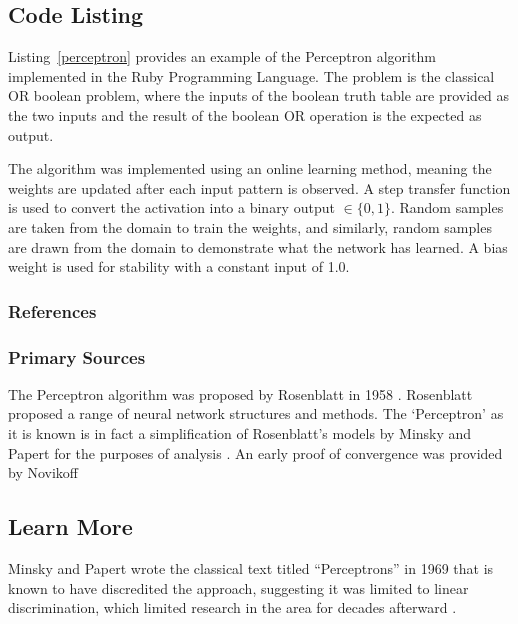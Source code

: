 \subsection{Code Listing}
Listing~\ref{perceptron} provides an example of the Perceptron algorithm implemented in the Ruby Programming Language. 
The problem is the classical OR boolean problem, where the inputs of the boolean truth table are provided as the two inputs and the result of the boolean OR operation is the expected as output.

The algorithm was implemented using an online learning method, meaning the weights are updated after each input pattern is observed. A step transfer function is used to convert the activation into a binary output $\in\{0,1\}$. Random samples are taken from the domain to train the weights, and similarly, random samples are drawn from the domain to demonstrate what the network has learned. A bias weight is used for stability with a constant input of 1.0.



\subsubsection{References}

% 
% 
\subsubsection{Primary Sources}
The Perceptron algorithm was proposed by Rosenblatt in 1958 \cite{Rosenblatt1958}. Rosenblatt proposed a range of neural network structures and methods. The `Perceptron' as it is known is in fact a simplification of Rosenblatt's models by Minsky and Papert for the purposes of analysis \cite{Minsky1969}.
An early proof of convergence was provided by Novikoff \cite{Novikoff1962}

% 
% 
\subsection{Learn More}
Minsky and Papert wrote the classical text titled ``Perceptrons'' in 1969 that is known to have discredited the approach, suggesting it was limited to linear discrimination, which limited research in the area for decades afterward \cite{Minsky1969}.



